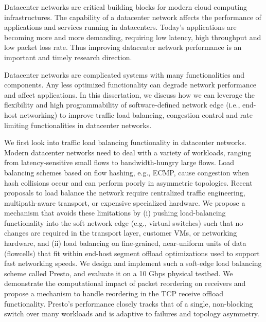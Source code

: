 
\vcinfo{}



Datacenter networks are critical building blocks for modern cloud computing 
infrastructures. The capability of a datacenter network affects the performance of 
applications and services running in datacenters. Today's applications are 
becoming more and more demanding, requiring low latency, high throughput and low packet 
loss rate. 
Thus improving datacenter network performance is an important and timely research direction.

Datacenter networks are complicated systems with many functionalities and components. 
Any less optimized functionality can degrade network performance and affect applications.
In this dissertation, we discuss how we can leverage the flexibility and high 
programmability of software-defined network edge (i.e., end-host networking) to 
improve traffic load balancing, congestion control and rate limiting functionalities in datacenter networks.

We first look into traffic load balancing functionality in datacenter networks.
Modern datacenter networks need to deal with a variety of workloads, ranging
from latency-sensitive small flows to bandwidth-hungry
large flows. Load balancing schemes based on flow hashing,
e.g., ECMP, cause congestion when hash collisions occur
and can perform poorly in asymmetric topologies. Recent
proposals to load balance the network require centralized
traffic engineering, multipath-aware transport, or expensive
specialized hardware. We propose a mechanism that
avoids these limitations by (i) pushing load-balancing functionality
into the soft network edge (e.g., virtual switches)
such that no changes are required in the transport layer, customer
VMs, or networking hardware, and (ii) load balancing
on fine-grained, near-uniform units of data (flowcells)
that fit within end-host segment offload optimizations used
to support fast networking speeds. We design and implement
such a soft-edge load balancing scheme called Presto, and
evaluate it on a 10 Gbps physical testbed. We demonstrate
the computational impact of packet reordering on receivers
and propose a mechanism to handle reordering in the TCP
receive offload functionality. Presto's performance closely
tracks that of a single, non-blocking switch over many workloads
and is adaptive to failures and topology asymmetry.

